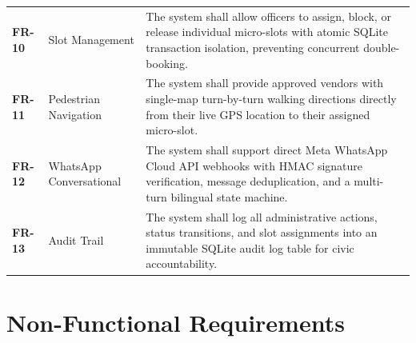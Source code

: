 \begin{table}[htbp]
\begin{tabularx}{\textwidth}{lp{}X}
\textbf{FR-10} & Slot Management & The system shall allow officers to assign, block, or release individual micro-slots with atomic SQLite transaction isolation, preventing concurrent double-booking. \\
\textbf{FR-11} & Pedestrian Navigation & The system shall provide approved vendors with single-map turn-by-turn walking directions directly from their live GPS location to their assigned micro-slot. \\
\textbf{FR-12} & WhatsApp Conversational & The system shall support direct Meta WhatsApp Cloud API webhooks with HMAC signature verification, message deduplication, and a multi-turn bilingual state machine. \\
\textbf{FR-13} & Audit Trail & The system shall log all administrative actions, status transitions, and slot assignments into an immutable SQLite audit log table for civic accountability. \\
\bottomrule
\end{tabularx}
\end{table}

\section{Non-Functional Requirements}
\label{sec:non_functional_requirements}

